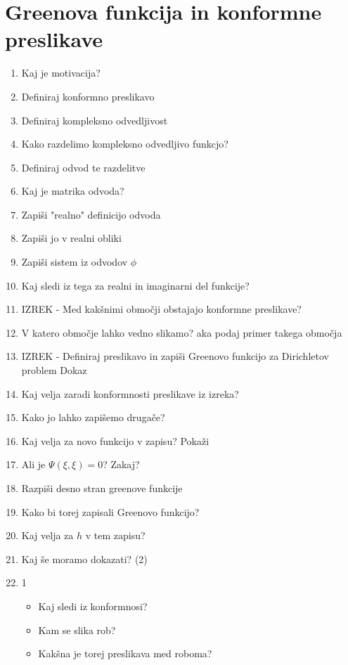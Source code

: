 \documentclass{article}
\begin{document}
    \section{Greenova funkcija in konformne preslikave}
    \begin{enumerate}
        \item Kaj je motivacija?
        \item Definiraj konformno preslikavo
        \item Definiraj kompleksno odvedljivost
        \item Kako razdelimo kompleksno odvedljivo funkcjo?
        \item Definiraj odvod te razdelitve
        \item Kaj je matrika odvoda?
        \item Zapiši "realno" definicijo odvoda
        \item Zapiši jo v realni obliki
        \item Zapiši sistem iz odvodov $\phi$
        \item Kaj sledi iz tega za realni in imaginarni del funkcije?
        \item IZREK - Med kakšnimi območji obstajajo konformne preslikave?
        \item V katero območje lahko vedno slikamo? aka podaj primer takega območja
        \item IZREK - Definiraj preslikavo in zapiši Greenovo funkcijo za Dirichletov problem
        Dokaz
        \item Kaj velja zaradi konformnosti preslikave iz izreka?
        \item Kako jo lahko zapišemo drugače?
        \item Kaj velja za novo funkcijo v zapisu? Pokaži
        \item Ali je $\Psi(\xi, \xi) = 0$? Zakaj?
        \item Razpiši desno stran greenove funkcije
        \item Kako bi torej zapisali Greenovo funkcijo?
        \item Kaj velja za $h$ v tem zapisu? 
        \item Kaj še moramo dokazati? (2)
        \item 1
        \begin{itemize}
            \item Kaj sledi iz konformnosi?
            \item Kam se slika rob?
            \item Kakšna je torej preslikava med roboma?

\end{itemize}
\end{enumerate}
\end{document}
